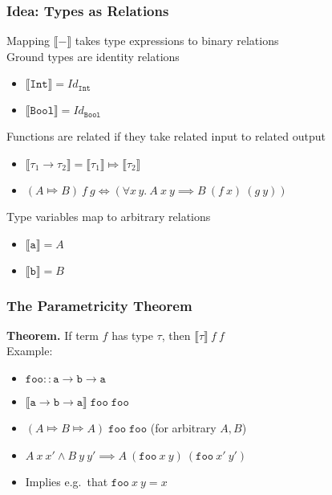\documentclass[english]{beamer}
\begin{document}
\begin{frame}
\frametitle{Idea: Types as Relations}
Mapping $\llbracket - \rrbracket$ takes type expressions to binary relations \\
\bigskip
\pause
Ground types are identity relations
\begin{itemize}
\item $\llbracket \mathtt{Int} \rrbracket = \mathit{Id}_\mathtt{Int}$
\item $\llbracket \mathtt{Bool} \rrbracket = \mathit{Id}_\mathtt{Bool}$
\end{itemize}
\bigskip
\pause
Functions are related if they take related input to related output
\begin{itemize}
\item $\llbracket \tau_1 \to \tau_2 \rrbracket = \llbracket\tau_1\rrbracket \Mapsto \llbracket\tau_2\rrbracket$
\item $(A \Mapsto B)\:f\:g \Longleftrightarrow (\forall x\,y.\:A\:x\:y \implies B\:(f\:x)\:(g\:y))$
\end{itemize}
\bigskip
\pause
Type variables map to arbitrary relations
\begin{itemize}
\item $\llbracket \mathtt{a} \rrbracket = A$
\item $\llbracket \mathtt{b} \rrbracket = B$
\end{itemize}
\end{frame}

\begin{frame}
\frametitle{The Parametricity Theorem}
\textbf{Theorem.} If term $f$ has type $\tau$, then $\llbracket\tau\rrbracket\:f\:f$\\
\bigskip
\pause
Example:
\begin{itemize}
\item $\mathtt{foo} :: \mathtt{a} \to \mathtt{b} \to \mathtt{a}$
\item $\llbracket \mathtt{a} \to \mathtt{b} \to \mathtt{a} \rrbracket\;\mathtt{foo}\;\mathtt{foo}$
\item $(A \Mapsto B \Mapsto A)\;\mathtt{foo}\;\mathtt{foo}$ (for arbitrary $A, B$)
\item $A\:x\:x' \land B\:y\:y' \implies A\:(\mathtt{foo}\:x\:y)\:(\mathtt{foo}\:x'\:y')$
\item Implies e.g.\ that $\mathtt{foo}\:x\:y = x$
\end{itemize}
\end{frame}
\end{document}
